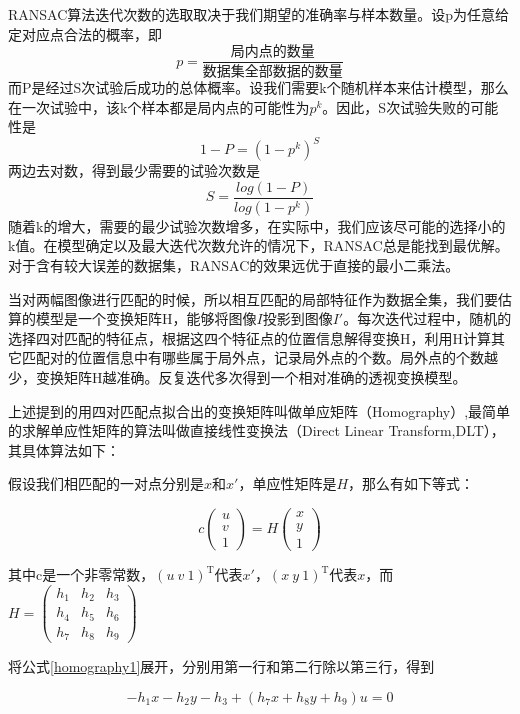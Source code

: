RANSAC算法迭代次数的选取取决于我们期望的准确率与样本数量。设p为任意给定对应点合法的概率，即
\[p = \frac{\text{局内点的数量}}{\text{数据集全部数据的数量}}\]
而P是经过S次试验后成功的总体概率。设我们需要k个随机样本来估计模型，那么在一次试验中，该k个样本都是局内点的可能性为\(p^k\)。因此，S次试验失败的可能性是
\[1 - P = (1 - p^k)^S\]
两边去对数，得到最少需要的试验次数是
\[S = \frac{log(1-P)}{log(1-p^k)}\]
随着k的增大，需要的最少试验次数增多，在实际中，我们应该尽可能的选择小的k值。在模型确定以及最大迭代次数允许的情况下，RANSAC总是能找到最优解。对于含有较大误差的数据集，RANSAC的效果远优于直接的最小二乘法。 

当对两幅图像进行匹配的时候，所以相互匹配的局部特征作为数据全集，我们要估算的模型是一个变换矩阵H，能够将图像\(I\)投影到图像\(I'\)。每次迭代过程中，随机的选择四对匹配的特征点，根据这四个特征点的位置信息解得变换H，利用H计算其它匹配对的位置信息中有哪些属于局外点，记录局外点的个数。局外点的个数越少，变换矩阵H越准确。反复迭代多次得到一个相对准确的透视变换模型。

上述提到的用四对匹配点拟合出的变换矩阵叫做单应矩阵（Homography）,最简单的求解单应性矩阵的算法叫做直接线性变换法（Direct Linear Transform,DLT）\cite{Dubrofsky:2009tz}，其具体算法如下：

假设我们相匹配的一对点分别是\(x\)和\(x'\)，单应性矩阵是\(H\)，那么有如下等式：

\begin{equation}
\label{homography1}
	c
	\begin{pmatrix}
	u \\
	v \\
	1
	\end{pmatrix}
	= H
	\begin{pmatrix}
	x \\
	y \\
	1
	\end{pmatrix}
\end{equation}


其中c是一个非零常数，\((u\ v\ 1)^\mathrm{T}\)代表\(x'\)，\((x \ y \ 1)^\mathrm{T}\)代表\(x\)，而
\(
H = 
\begin{pmatrix}
h_1 & h_2 & h_3 \\
h_4 & h_5 & h_6 \\
h_7 & h_8 & h_9
\end{pmatrix}
\)

将公式\eqref{homography1}展开，分别用第一行和第二行除以第三行，得到

\begin{equation}
\label{homography2}
-h_1x - h_2y - h_3 + (h_7x+h_8y+h_9)u = 0
\end{equation}


